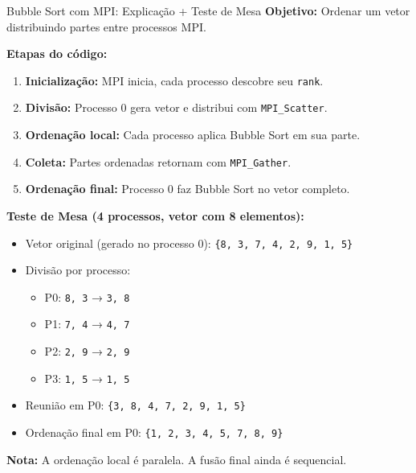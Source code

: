 \documentclass{beamer}
\begin{document}
\begin{frame}{Bubble Sort com MPI: Explicação + Teste de Mesa}
\textbf{Objetivo:} Ordenar um vetor distribuindo partes entre processos MPI.

\vspace{0.5em}
\textbf{Etapas do código:}
\begin{enumerate}
    \item \textbf{Inicialização:} MPI inicia, cada processo descobre seu \texttt{rank}.
    \item \textbf{Divisão:} Processo 0 gera vetor e distribui com \texttt{MPI\_Scatter}.
    \item \textbf{Ordenação local:} Cada processo aplica Bubble Sort em sua parte.
    \item \textbf{Coleta:} Partes ordenadas retornam com \texttt{MPI\_Gather}.
    \item \textbf{Ordenação final:} Processo 0 faz Bubble Sort no vetor completo.
\end{enumerate}

\vspace{0.5em}
\textbf{Teste de Mesa (4 processos, vetor com 8 elementos):}

\begin{itemize}
    \item Vetor original (gerado no processo 0): \texttt{\{8, 3, 7, 4, 2, 9, 1, 5\}}
    \item Divisão por processo:
    \begin{itemize}
        \item P0: \texttt{8, 3} → \texttt{3, 8}
        \item P1: \texttt{7, 4} → \texttt{4, 7}
        \item P2: \texttt{2, 9} → \texttt{2, 9}
        \item P3: \texttt{1, 5} → \texttt{1, 5}
    \end{itemize}
    \item Reunião em P0: \texttt{\{3, 8, 4, 7, 2, 9, 1, 5\}}
    \item Ordenação final em P0: \texttt{\{1, 2, 3, 4, 5, 7, 8, 9\}}
\end{itemize}

\vspace{0.5em}
\textbf{Nota:} A ordenação local é paralela. A fusão final ainda é sequencial.
\end{frame}
\end{document}
